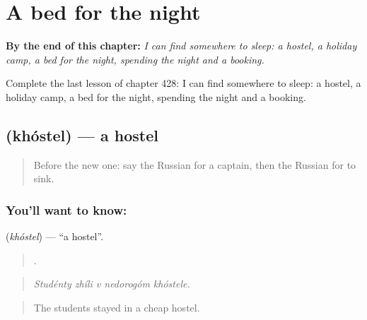 
\chapter{A bed for the night}
\label{ch:ru-a-bed-for-the-night}

\begin{chapteropening}
\textbf{By the end of this chapter:} \emph{I can find somewhere to sleep: a hostel, a holiday camp, a bed for the night, spending the night and a booking.}

Complete the last lesson of chapter 428: I can find somewhere to sleep: a hostel, a holiday camp, a bed for the night, spending the night and a booking.
\end{chapteropening}

\section[\texorpdfstring{\ru{хостел} (khóstel)}{хостел (khóstel)}]{ (khóstel) — a hostel}

\label{lesson:RU-C428-khostel}



\begin{quote}
Before the new one: say the Russian for a captain, then the Russian for to sink.
\end{quote}

\subsection*{You'll want to know: }
\textbf{} (\emph{khóstel}) — \textquotedblleft{}a hostel\textquotedblright{}.

\begin{quote}
    .
\end{quote}

\begin{quote}
\emph{Studénty zhíli v nedorogóm khóstele.}
\end{quote}

\begin{quote}
The students stayed in a cheap hostel.
\end{quote}


